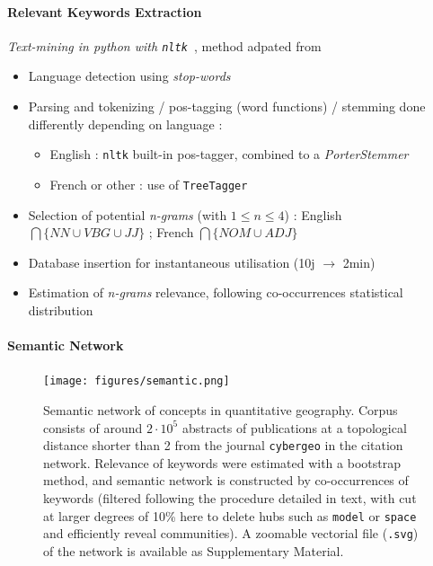 \paragraph{Relevant Keywords Extraction}


\textit{Text-mining in python with \texttt{nltk}~\cite{bird2006nltk}}, method adpated from
\cite{chavalarias2013phylomemetic}


\bigskip

\begin{itemize}
\item Language detection using \textit{stop-words}
\item Parsing and tokenizing / pos-tagging (word functions) / stemming done differently depending on language :
\begin{itemize}
\item English : \texttt{nltk} built-in pos-tagger, combined to a \emph{PorterStemmer}
\item French or other : use of \texttt{TreeTagger}~\cite{schmid1994probabilistic}
\end{itemize}
\item Selection of potential \textit{n-grams} (with $1 \leq n \leq 4$) : English $\bigcap \{NN \cup VBG \cup JJ \}$ ;  French  $\bigcap \{NOM \cup ADJ\}$
\item Database insertion for instantaneous utilisation (10j $\rightarrow$ 2min)
\item Estimation of \textit{n-grams} relevance, following co-occurrences statistical distribution
\end{itemize}



\paragraph{Semantic Network}









\begin{figure}
\hspace{-2cm}
\texttt{[image: figures/semantic.png]}
\caption[Semantic network of concepts in quantitative geography]{Semantic network of concepts in quantitative geography. Corpus consists of around $2\cdot 10^5$ abstracts of publications at a topological distance shorter than 2 from the journal \texttt{cybergeo} in the citation network. Relevance of keywords were estimated with a bootstrap method, and semantic network is constructed by co-occurrences of keywords (filtered following the procedure detailed in text, with cut at larger degrees of 10\% here to delete hubs such as \texttt{model} or \texttt{space} and efficiently reveal communities). A zoomable vectorial file (\texttt{.svg}) of the network is available as Supplementary Material.}
\label{fig:quantepistemo:semanticnw}
\end{figure}





